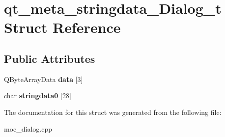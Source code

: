 \hypertarget{structqt__meta__stringdata__Dialog__t}{}\section{qt\+\_\+meta\+\_\+stringdata\+\_\+\+Dialog\+\_\+t Struct Reference}
\label{structqt__meta__stringdata__Dialog__t}
\subsection*{Public Attributes}
\begin{DoxyCompactItemize}
\item 
\mbox{\label{structqt__meta__stringdata__Dialog__t_a4981086229b25797c939ebe1e0518086}} 
Q\+Byte\+Array\+Data {\bfseries data} \mbox{[}3\mbox{]}
\item 
\mbox{\label{structqt__meta__stringdata__Dialog__t_ab2e95b966b973979804b5ee52f5f0813}} 
char {\bfseries stringdata0} \mbox{[}28\mbox{]}
\end{DoxyCompactItemize}


The documentation for this struct was generated from the following file\+:\begin{DoxyCompactItemize}
\item 
moc\+\_\+dialog.\+cpp\end{DoxyCompactItemize}
